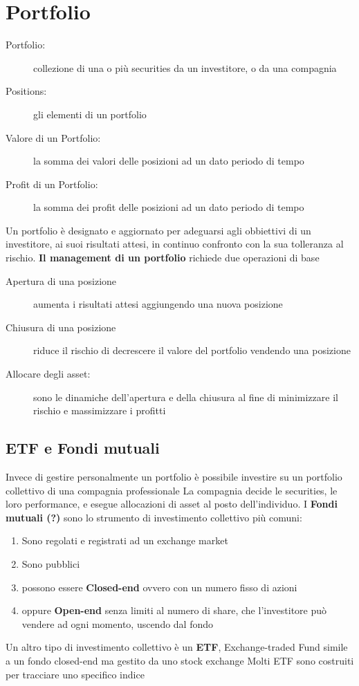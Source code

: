 \documentclass[a4paper,11pt]{report}
\begin{document}
{\section{Portfolio}
\begin{description}
	\item[Portfolio:] collezione di una o più securities da un investitore, o da una compagnia
	\item[Positions:] gli elementi di un portfolio
	\item[Valore di un Portfolio:] la somma dei valori delle posizioni ad un dato periodo di tempo
	\item[Profit di un Portfolio:] la somma dei profit delle posizioni ad un dato periodo di tempo
\end{description}
	Un portfolio è designato e aggiornato per adeguarsi agli obbiettivi di un investitore, ai suoi risultati attesi, in continuo 			confronto con la sua tolleranza al rischio. \newline
	\textbf{Il management di un portfolio} richiede due operazioni di base
\begin{description}
	\item[Apertura di una posizione] aumenta i risultati attesi aggiungendo una nuova posizione
	\item[Chiusura di una posizione] riduce il rischio di decrescere il valore del portfolio vendendo una posizione
	\item[Allocare degli asset:] sono le dinamiche dell'apertura e della chiusura al fine di minimizzare il rischio e massimizzare i 		profitti
\end{description}
\subsection{ETF e Fondi mutuali}
	Invece di gestire personalmente un portfolio è possibile investire su un portfolio collettivo di una compagnia professionale \newline
	La compagnia decide le securities, le loro performance, e esegue allocazioni di asset al posto dell'individuo. \newline
	I \textbf{Fondi mutuali (?)} sono lo strumento di investimento collettivo più comuni:
\begin{enumerate} %
	\item Sono regolati e registrati ad un exchange market	 
	\item Sono pubblici
	\item possono essere \textbf{Closed-end} ovvero con un numero fisso di azioni
	\item oppure \textbf{Open-end} senza limiti al numero di share, che l'investitore può vendere ad ogni momento, uscendo dal 	fondo
\end{enumerate}
	Un altro tipo di investimento collettivo è un \textbf{ETF}, Exchange-traded Fund \newline
	simile a un fondo closed-end ma gestito da uno stock exchange \newline
	Molti ETF sono costruiti per tracciare uno specifico indice %

}
\end{document}
